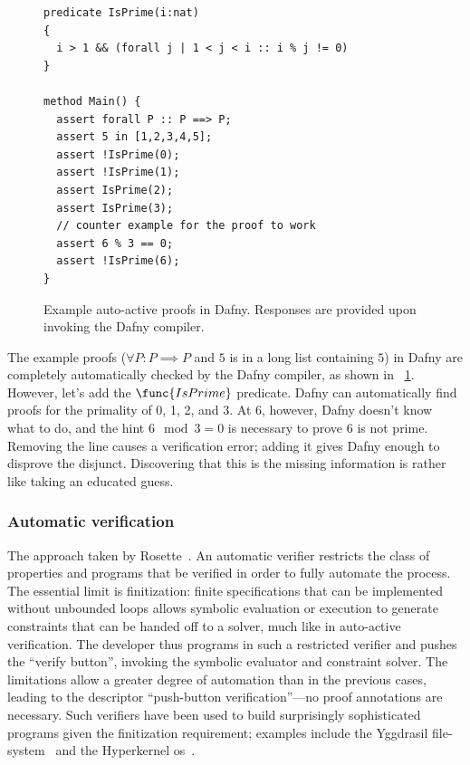 \begin{figure}[ht]
\begin{verbatim}
predicate IsPrime(i:nat)
{
  i > 1 && (forall j | 1 < j < i :: i % j != 0)
}

method Main() {
  assert forall P :: P ==> P;
  assert 5 in [1,2,3,4,5];
  assert !IsPrime(0);
  assert !IsPrime(1);
  assert IsPrime(2);
  assert IsPrime(3);
  // counter example for the proof to work
  assert 6 % 3 == 0;
  assert !IsPrime(6);
}
\end{verbatim}
    \caption{Example auto-active proofs in Dafny. Responses are provided upon
    invoking the Dafny compiler.}\label{F:dafny_ex}
\end{figure}

The example proofs (\(\forall P: P \implies P\) and \(5\) is in a long list
containing \(5\)) in Dafny are completely automatically checked by the Dafny
compiler, as shown in \figurename~\ref{F:dafny_ex}. However, let's add the
\(\func{IsPrime}\) predicate. Dafny can automatically find proofs for the
primality of 0, 1, 2, and 3. At 6, however, Dafny doesn't know what to do, and
the hint \(6 \mod 3 = 0\) is necessary to prove 6 is not prime. Removing the
line causes a verification error; adding it gives Dafny enough to disprove the
disjunct. Discovering that this is the missing information is rather like taking
an educated guess.

\subsubsection{Automatic verification}

The approach taken by Rosette~\cite{Torlak_2013}. An automatic verifier
restricts the class of properties and programs that be verified in order to
fully automate the process. The essential limit is finitization: finite
specifications that can be implemented without unbounded loops allows symbolic
evaluation or execution to generate constraints that can be handed off to a
solver, much like in auto-active verification. The developer thus programs in
such a restricted verifier and pushes the ``verify button'', invoking the symbolic
evaluator and constraint solver. The limitations allow a greater degree of
automation than in the previous cases, leading to the descriptor ``push-button
verification''---no proof annotations are necessary. Such verifiers have been used
to build surprisingly sophisticated programs given the finitization requirement;
examples include the Yggdrasil file-system~\cite{Sigurbjarnarson_2016} and the
Hyperkernel \gls{os}~\cite{Nelson_2017}.

